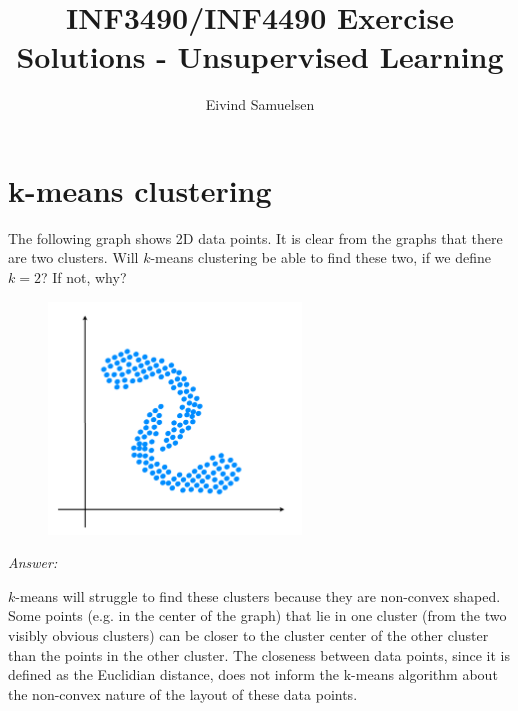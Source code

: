 
\title{\vspace{-2cm}INF3490/INF4490 Exercise Solutions - Unsupervised Learning}
\author{Eivind Samuelsen}
\date{}

\setlength\parindent{0pt}


    \renewcommand\marginsymbol[1][0pt]{%
  \tabto*{0cm}\makebox[-1cm][c]{$\mathbb{P}$}\tabto*{\TabPrevPos}}

\maketitle


\section{k-means clustering}
The following graph shows 2D data points. It is clear from the graphs that there are two clusters. Will \(k\)-means clustering be able to find these two, if we define \(k = 2\)? If not, why?
\begin{figure}[H]
\begin{center}
\includegraphics[width=0.6\textwidth]{two_clusters.png}
\end{center}
\end{figure}

\textit{Answer:}

\(k\)-means will struggle to find these clusters because they are non-convex shaped.
Some points (e.g. in the center of the graph) that lie in one cluster (from the two visibly obvious clusters) can be closer to the cluster center of the other cluster than the points in the other cluster.
The closeness between data points, since it is defined as the Euclidian distance, does not inform the k-means algorithm about the non-convex nature of the layout of these data points.

